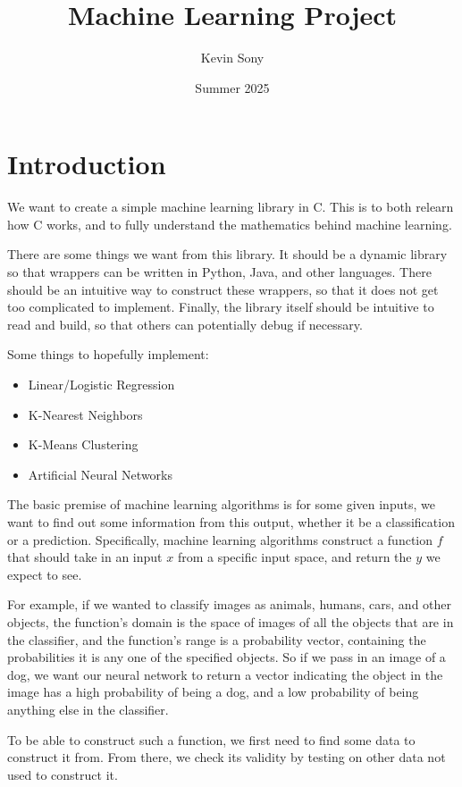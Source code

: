 \documentclass{article}
\title{Machine Learning Project}
\author{Kevin Sony}
\date{Summer 2025}
\begin{document}
	
	\maketitle
	
	\section{Introduction}
	We want to create a simple machine learning library in C. This is to both relearn how C works, and to fully understand the mathematics behind machine learning.
	
	There are some things we want from this library. It should be a dynamic library so that wrappers can be written in Python, Java, and other languages. There should be an intuitive way to construct these wrappers, so that it does not get too complicated to implement. Finally, the library itself should be intuitive to read and build, so that others can potentially debug if necessary.

	Some things to hopefully implement:
	\begin{itemize}
		\item Linear/Logistic Regression
		\item K-Nearest Neighbors
		\item K-Means Clustering
		\item Artificial Neural Networks
	\end{itemize}
	
	The basic premise of machine learning algorithms is for some given inputs, we want to find out some information from this output, whether it be a classification or a prediction. Specifically, machine learning algorithms  construct a function \(f\) that should take in an input \(x\) from a specific input space, and return the \(y\) we expect to see.
	
	For example, if we wanted to classify images as animals, humans, cars, and other objects, the function's domain is the space of images of all the objects that are in the classifier, and the function's range is a probability vector, containing the probabilities it is any one of the specified objects. So if we pass in an image of a dog, we want our neural network to return a vector indicating the object in the image has a high probability of being a dog, and a low probability of being anything else in the classifier.
	
	To be able to construct such a function, we first need to find some data to construct it from. From there, we check its validity by testing on other data not used to construct it.
	
\end{document}
